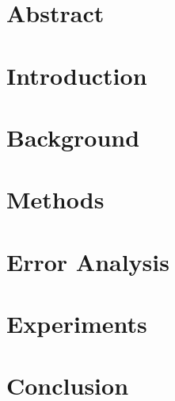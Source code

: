 \section{Abstract}\label{ndossec:abs}
	

\section{Introduction}\label{ndossec:int}
	

\section{Background}\label{ndossec:bac}
	

\section{Methods}\label{ndossec:met}
	

\section{Error Analysis}\label{ndossec:err}
	

\section{Experiments}\label{ndossec:exp}
	

\section{Conclusion}\label{ndossec:con}
	